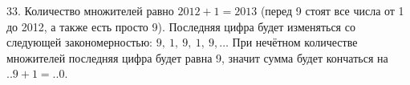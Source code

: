 33. Количество множителей равно $2012+1=2013$ (перед 9 стоят все числа от 1 до 2012, а также есть просто 9). Последняя цифра будет изменяться со следующей закономерностью: $9,\ 1,\ 9,\ 1,\ 9,\ldots$ При нечётном количестве множителей последняя цифра будет равна 9, значит сумма будет кончаться на $..9+1=..0$.\\
